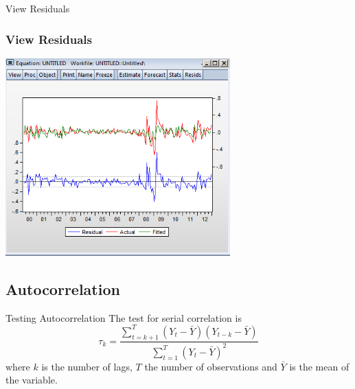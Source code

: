 \documentclass[14pt,xcolor=pdftex,dvipsnames,table]{beamer}\usepackage[]{graphicx}\usepackage[]{color}
\begin{document}
\begin{frame}{View Residuals}
\graphicspath{{./Figures/}}

\frametitle{View Residuals}
\begin{center}
\includegraphics[height = 3.0in]{Resid}
\end{center}
\end{frame} 

\subsection{Autocorrelation}
\begin{frame}{Testing Autocorrelation}
The test for serial correlation is 
\begin{equation*}
\tau_k = \frac{\sum_{t = k + 1}^T (Y_t - \bar{Y})(Y_{t - k} - \bar{Y})}{\sum_{t= 1}^T (Y_t - \bar{Y})^2}
\end{equation*}
where $k$ is the number of lags, $T$ the number of observations and $\bar{Y}$ is the mean of the variable. 
\end{frame}
\end{document}
